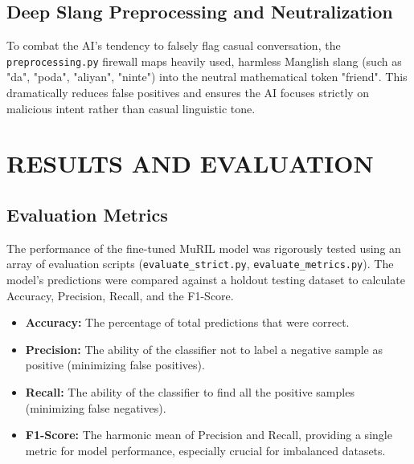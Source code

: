 \documentclass[12pt,a4paper]{report}
\begin{document}
\section{Deep Slang Preprocessing and Neutralization}
To combat the AI's tendency to falsely flag casual conversation, the \texttt{preprocessing.py} firewall maps heavily used, harmless Manglish slang (such as "da", "poda", "aliyan", "ninte") into the neutral mathematical token "friend". This dramatically reduces false positives and ensures the AI focuses strictly on malicious intent rather than casual linguistic tone.

\chapter{RESULTS AND EVALUATION}

\section{Evaluation Metrics}
The performance of the fine-tuned MuRIL model was rigorously tested using an array of evaluation scripts (\texttt{evaluate\_strict.py}, \texttt{evaluate\_metrics.py}). The model's predictions were compared against a holdout testing dataset to calculate Accuracy, Precision, Recall, and the F1-Score.

\begin{itemize}
    \item \textbf{Accuracy:} The percentage of total predictions that were correct.
    \item \textbf{Precision:} The ability of the classifier not to label a negative sample as positive (minimizing false positives).
    \item \textbf{Recall:} The ability of the classifier to find all the positive samples (minimizing false negatives).
    \item \textbf{F1-Score:} The harmonic mean of Precision and Recall, providing a single metric for model performance, especially crucial for imbalanced datasets.
\end{itemize}
\end{document}
